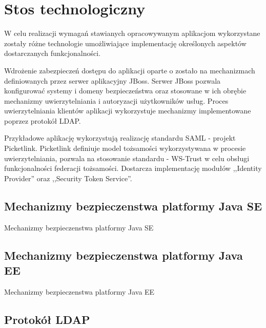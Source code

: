 \chapter{Stos technologiczny}
\label{cha:stosTechnologiczny}

{\it

W celu realizacji wymagań stawianych opracowywanym aplikacjom wykorzystane zostały różne technologie umożliwiające implementację określonych aspektów dostarczanych funkcjonalności.

Wdrożenie zabezpieczeń dostępu do aplikacji oparte o zostało na mechanizmach definiowanych przez serwer aplikacyjny JBoss. Serwer JBoss pozwala konfigurować systemy i domeny bezpieczeństwa oraz stosowane w ich obrębie mechanizmy uwierzytelniania i autoryzacji użytkowników usług. Proces uwierzytelniania klientów aplikacji wykorzystuje mechanizmy implementowane poprzez protokół LDAP. 

Przykładowe aplikację wykorzystują realizację standardu SAML - projekt Picketlink. Picketlink definiuje model tożsamości wykorzystywana w procesie uwierzytelniania, pozwala na stosowanie standardu - WS-Trust w celu obsługi funkcjonalności federacji tożsamości. Dostarcza implementację modułów ,,Identity Provider'' oraz ,,Security Token Service''. 

}


\section{Mechanizmy bezpieczenstwa platformy Java SE}
\label{sec:javaSE}

Mechanizmy bezpieczenstwa platformy Java SE



\section{Mechanizmy bezpieczenstwa platformy Java EE}
\label{sec:javaEE}

Mechanizmy bezpieczenstwa platformy Java EE


\section{Protokół LDAP}
\label{sec:ldap}

